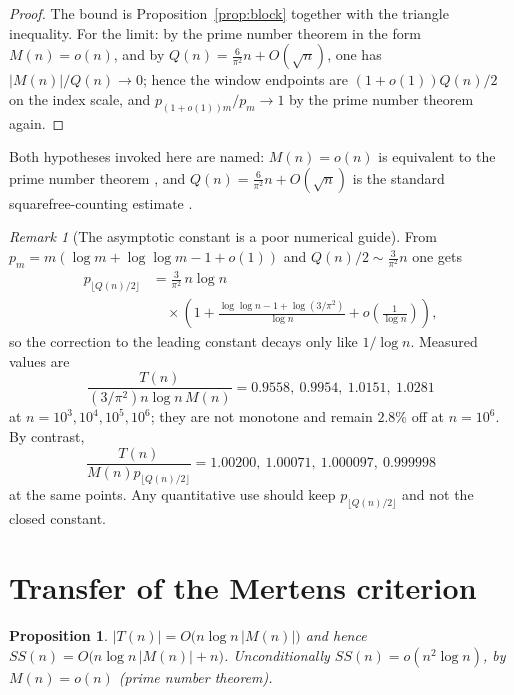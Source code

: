 \documentclass[11pt]{amsart}
\numberwithin{equation}{section}
\theoremstyle{plain}
\newtheorem{proposition}[theorem]{Proposition}
\theoremstyle{definition}
\theoremstyle{remark}
\newtheorem{remark}[theorem]{Remark}
\newcommand{\Mert}{M}
\newcommand{\Sq}{Q}
\begin{document}
\begin{proof}
The bound is Proposition~\ref{prop:block} together with the triangle
inequality. For the limit: by the prime number theorem in the form
$\Mert(n)=o(n)$, and by $\Sq(n)=\tfrac{6}{\pi^2}n+O(\sqrt n)$, one has
$|\Mert(n)|/\Sq(n)\to0$; hence the window endpoints are
$(1+o(1))\Sq(n)/2$ on the index scale, and $p_{(1+o(1))m}/p_m\to1$ by the prime
number theorem again.
\end{proof}

Both hypotheses invoked here are named: $\Mert(n)=o(n)$ is equivalent to the prime number theorem
\cite{Titchmarsh1986}, and $\Sq(n)=\tfrac6{\pi^2}n+O(\sqrt n)$ is the standard
squarefree-counting estimate \cite{Apostol1976}.

\begin{remark}[The asymptotic constant is a poor numerical guide]
\label{rem:prime-scale-data}
From $p_m=m(\log m+\log\log m-1+o(1))$ and $\Sq(n)/2\sim \tfrac3{\pi^2}n$ one
gets
\begin{equation}
\label{eq:prime-scale-expansion}
\begin{aligned}
p_{\lfloor \Sq(n)/2\rfloor}
&=\frac{3}{\pi^2}\,n\log n\\
&\quad\times\left(1+\frac{\log\log n-1+\log(3/\pi^2)}{\log n}
+o\!\left(\tfrac1{\log n}\right)\right),
\end{aligned}
\end{equation}
so the correction to the leading constant decays only like $1/\log n$. Measured
values are
\begin{equation}
\label{eq:leading-scale-data}
\frac{T(n)}{(3/\pi^2)n\log n\,\Mert(n)}
=0.9558,\ 0.9954,\ 1.0151,\ 1.0281
\end{equation}
at $n=10^3,10^4,10^5,10^6$; they are not monotone and remain $2.8\%$ off at
$n=10^6$. By contrast,
\begin{equation}
\label{eq:exact-prime-scale-data}
\frac{T(n)}{\Mert(n)p_{\lfloor \Sq(n)/2\rfloor}}
=1.00200,\ 1.00071,\ 1.000097,\ 0.999998
\end{equation}
at the same points. Any quantitative use should keep
$p_{\lfloor \Sq(n)/2\rfloor}$ and not the closed constant.
\end{remark}

\section{Transfer of the Mertens criterion}
\label{sec:mertens-transfer}

\begin{proposition}
\label{prop:growth}
$|T(n)|=O\bigl(n\log n\,|\Mert(n)|\bigr)$ and hence
$SS(n)=O\bigl(n\log n\,|\Mert(n)|+n\bigr)$. Unconditionally
$SS(n)=o(n^2\log n)$, by $\Mert(n)=o(n)$ (prime number theorem).
\end{proposition}
\end{document}

